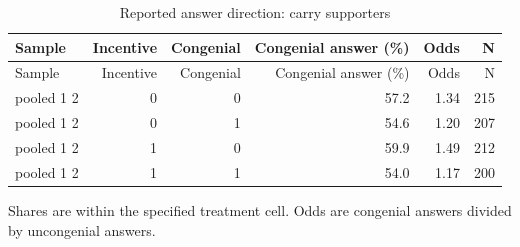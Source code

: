 
\begin{longtable}[t]{lrrrrr}
\caption{\label{tab:demand_supp}Reported answer direction: carry supporters}\\
\toprule
Sample & Incentive & Congenial & Congenial answer (\%) & Odds & N\\
\midrule
\endfirsthead
\toprule
Sample & Incentive & Congenial & Congenial answer (\%) & Odds & N\\
\midrule
\endhead
pooled 1 2 & 0 & 0 & 57.2 & 1.34 & 215\\
pooled 1 2 & 0 & 1 & 54.6 & 1.20 & 207\\
pooled 1 2 & 1 & 0 & 59.9 & 1.49 & 212\\
pooled 1 2 & 1 & 1 & 54.0 & 1.17 & 200\\
\bottomrule
\end{longtable}
\noindent\footnotesize Shares are within the specified treatment cell. Odds are congenial answers divided by uncongenial answers.\par\normalsize
